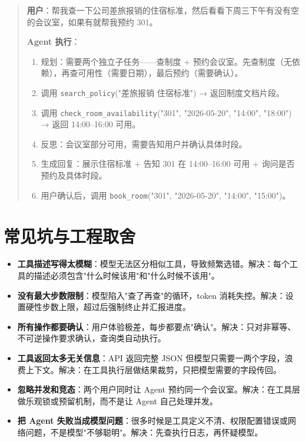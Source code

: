 \begin{quote}
\textbf{用户}：帮我查一下公司差旅报销的住宿标准，然后看看下周三下午有没有空的会议室，如果有就帮我预约 301。

\textbf{Agent 执行}：
\begin{enumerate}
  \item 规划：需要两个独立子任务——查制度 + 预约会议室。先查制度（无依赖），再查可用性（需要日期），最后预约（需要确认）。
  \item 调用 \texttt{search\_policy}("差旅报销 住宿标准") → 返回制度文档片段。
  \item 调用 \texttt{check\_room\_availability}("301", "2026-05-20", "14:00", "18:00") → 返回 14:00--16:00 可用。
  \item 反思：会议室部分可用，需要告知用户并确认具体时段。
  \item 生成回复：展示住宿标准 + 告知 301 在 14:00--16:00 可用 + 询问是否预约及具体时段。
  \item 用户确认后，调用 \texttt{book\_room}("301", "2026-05-20", "14:00", "15:00")。
\end{enumerate}
\end{quote}

\section{常见坑与工程取舍}
\begin{itemize}
  \item \textbf{工具描述写得太模糊}：模型无法区分相似工具，导致频繁选错。解决：每个工具的描述必须包含"什么时候该用"和"什么时候不该用"。
  \item \textbf{没有最大步数限制}：模型陷入"查了再查"的循环，token 消耗失控。解决：设置硬性步数上限，超过后强制终止并汇报进度。
  \item \textbf{所有操作都要确认}：用户体验极差，每步都要点"确认"。解决：只对非幂等、不可逆操作要求确认，查询类自动执行。
  \item \textbf{工具返回太多无关信息}：API 返回完整 JSON 但模型只需要一两个字段，浪费上下文。解决：在工具执行层做结果裁剪，只把模型需要的字段传回。
  \item \textbf{忽略并发和竞态}：两个用户同时让 Agent 预约同一个会议室。解决：在工具层做乐观锁或预留机制，而不是让 Agent 自己处理并发。
  \item \textbf{把 Agent 失败当成模型问题}：很多时候是工具定义不清、权限配置错误或网络问题，不是模型"不够聪明"。解决：先查执行日志，再怀疑模型。
\end{itemize}

